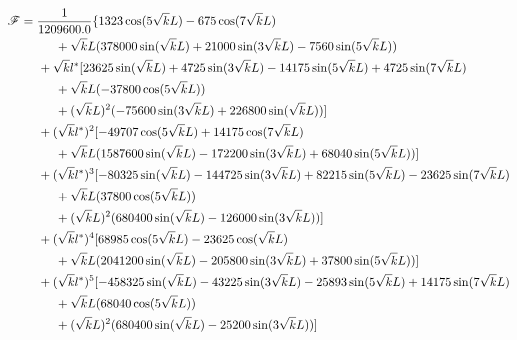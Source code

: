 {\scriptsize
 \begin{align*}
  \mathscr{F}&=\frac{1}{1209600.0} \{1323 \cos(5\sqrt{k}L)-675 \cos(7\sqrt{k}L)\\
        &\hspace{1cm}+\sqrt{k}L (378000 \sin(\sqrt{k}L)+21000 \sin(3\sqrt{k}L)-7560 \sin(5\sqrt{k}L))\\
        &\hspace{0.5cm}+\sqrt{k}l^* [23625 \sin(\sqrt{k}L)+4725 \sin(3\sqrt{k}L)-14175 \sin(5\sqrt{k}L)+4725 \sin(7\sqrt{k}L)\\
        &\hspace{1cm}+\sqrt{k}L  (-37800 \cos(5\sqrt{k}L))\\
        &\hspace{1cm}+(\sqrt{k}L)^2 (-75600 \sin(3\sqrt{k}L)+226800 \sin(\sqrt{k}L))]\\
        &\hspace{0.5cm}+(\sqrt{k}l^*)^2 [-49707 \cos(5\sqrt{k}L)+14175 \cos(7\sqrt{k}L)\\
        &\hspace{1cm}+\sqrt{k}L  (1587600 \sin(\sqrt{k}L)-172200 \sin(3\sqrt{k}L)+68040 \sin(5\sqrt{k}L))]\\
        &\hspace{0.5cm}+(\sqrt{k}l^*)^3 [-80325 \sin(\sqrt{k}L)-144725 \sin(3\sqrt{k}L)+82215 \sin(5\sqrt{k}L)-23625 \sin(7\sqrt{k}L)\\
        &\hspace{1cm}+\sqrt{k}L  (37800 \cos(5\sqrt{k}L))\\
        &\hspace{1cm}+(\sqrt{k}L)^2 (680400 \sin(\sqrt{k}L)-126000 \sin(3\sqrt{k}L))]\\
        &\hspace{0.5cm}+(\sqrt{k}l^*)^4 [68985 \cos(5\sqrt{k}L)-23625 \cos(\sqrt{k}L)\\
        &\hspace{1cm}+\sqrt{k}L  (2041200 \sin(\sqrt{k}L)-205800 \sin(3\sqrt{k}L)+37800 \sin(5\sqrt{k}L))]\\
        &\hspace{0.5cm}+(\sqrt{k}l^*)^5 [-458325 \sin(\sqrt{k}L)-43225 \sin(3\sqrt{k}L)-25893 \sin(5\sqrt{k}L)+14175 \sin(7\sqrt{k}L)\\
        &\hspace{1cm}     +\sqrt{k}L  (68040 \cos(5\sqrt{k}L))\\
        &\hspace{1cm}     +(\sqrt{k}L)^2 (680400 \sin(\sqrt{k}L)-25200 \sin(3\sqrt{k}L))]\\

\end{align*}}
